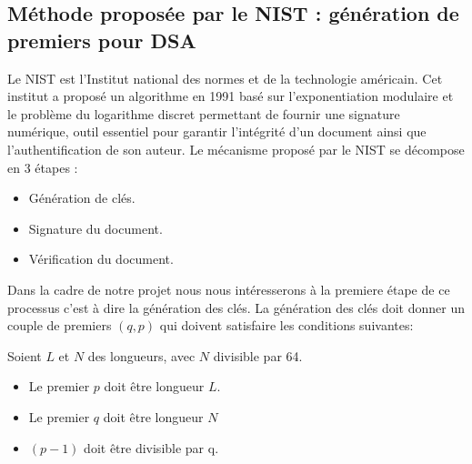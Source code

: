\documentclass[a4paper,11pt]{article}
\begin{document}
\subsection{Méthode proposée par le NIST :  génération de premiers pour DSA}
Le NIST est l'Institut national des normes et de la technologie américain. Cet institut a proposé un algorithme en 1991 basé sur l'exponentiation modulaire et le problème du logarithme discret permettant de fournir une signature numérique, outil essentiel pour garantir l'intégrité d'un document  ainsi que l'authentification de son auteur.\newline
Le mécanisme proposé par le NIST se décompose en 3 étapes : \newline
\begin{itemize}
\item Génération de clés. 
\item Signature du document.
\item Vérification du document.
\end{itemize}
\medbreak
Dans la cadre de notre projet nous nous intéresserons à la premiere étape de ce processus c'est à dire la génération des clés. 
La génération des clés doit donner un couple de premiers $(q,p)$ qui doivent satisfaire les conditions suivantes:


Soient $L$ et $N$ des longueurs, avec $N$ divisible par 64.
\medbreak
\begin{itemize}
\item Le premier $p$ doit être longueur $L$.  
\item Le premier $q$ doit être longueur $N$
\item $(p-1)$ doit être divisible par q.
\end{itemize}
\end{document}
